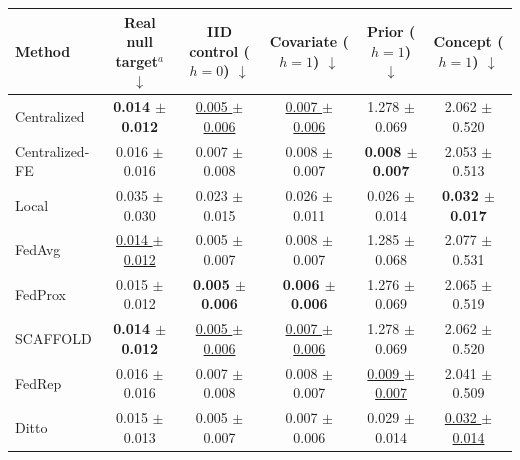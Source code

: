 \begin{tabular}{lccccc}
\toprule
Method & Real null target$^{a}$ $\downarrow$ & IID control ($h=0$) $\downarrow$ & Covariate ($h=1$) $\downarrow$ & Prior ($h=1$) $\downarrow$ & Concept ($h=1$) $\downarrow$ \\
\midrule
Centralized & \textbf{0.014 $\pm$ 0.012} & \underline{0.005 $\pm$ 0.006} & \underline{0.007 $\pm$ 0.006} & 1.278 $\pm$ 0.069 & 2.062 $\pm$ 0.520 \\
Centralized-FE & 0.016 $\pm$ 0.016 & 0.007 $\pm$ 0.008 & 0.008 $\pm$ 0.007 & \textbf{0.008 $\pm$ 0.007} & 2.053 $\pm$ 0.513 \\
Local & 0.035 $\pm$ 0.030 & 0.023 $\pm$ 0.015 & 0.026 $\pm$ 0.011 & 0.026 $\pm$ 0.014 & \textbf{0.032 $\pm$ 0.017} \\
FedAvg & \underline{0.014 $\pm$ 0.012} & 0.005 $\pm$ 0.007 & 0.008 $\pm$ 0.007 & 1.285 $\pm$ 0.068 & 2.077 $\pm$ 0.531 \\
FedProx & 0.015 $\pm$ 0.012 & \textbf{0.005 $\pm$ 0.006} & \textbf{0.006 $\pm$ 0.006} & 1.276 $\pm$ 0.069 & 2.065 $\pm$ 0.519 \\
SCAFFOLD & \textbf{0.014 $\pm$ 0.012} & \underline{0.005 $\pm$ 0.006} & \underline{0.007 $\pm$ 0.006} & 1.278 $\pm$ 0.069 & 2.062 $\pm$ 0.520 \\
FedRep & 0.016 $\pm$ 0.016 & 0.007 $\pm$ 0.008 & 0.008 $\pm$ 0.007 & \underline{0.009 $\pm$ 0.007} & 2.041 $\pm$ 0.509 \\
Ditto & 0.015 $\pm$ 0.013 & 0.005 $\pm$ 0.007 & 0.007 $\pm$ 0.006 & 0.029 $\pm$ 0.014 & \underline{0.032 $\pm$ 0.014} \\
\bottomrule
\end{tabular}
